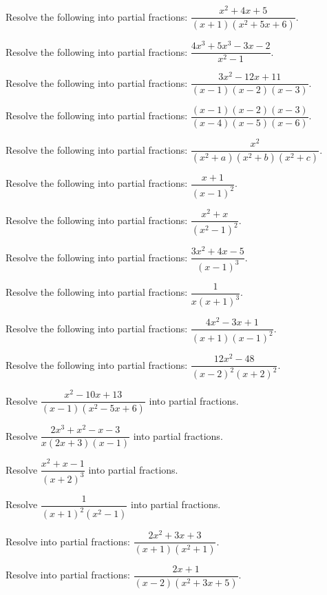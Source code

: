 \documentclass[11pt,a4paper]{article}
\begin{document}
\begin{longlist}
\item Resolve the following into partial fractions: $\dfrac{x^2+4x+5}{(x+1)(x^2+5x+6)}$.

\item Resolve the following into partial fractions: $\dfrac{4x^3+5x^3-3x-2}{x^2-1}$.

\item Resolve the following into partial fractions: $\dfrac{3x^2-12x+11}{(x-1)(x-2)(x-3)}$.

\item Resolve the following into partial fractions: $\dfrac{(x-1)(x-2)(x-3)}{(x-4)(x-5)(x-6)}$.

\item Resolve the following into partial fractions: $\dfrac{x^2}{(x^2+a)(x^2+b)(x^2+c)}$.

\item Resolve the following into partial fractions: $\dfrac{x+1}{(x-1)^2}$.

\item Resolve the following into partial fractions: $\dfrac{x^2+x}{(x^2-1)^2}$.

\item Resolve the following into partial fractions: $\dfrac{3x^2+4x-5}{(x-1)^3}$.

\item Resolve the following into partial fractions: $\dfrac{1}{x(x+1)^3}$.

\item Resolve the following into partial fractions: $\dfrac{4x^2-3x+1}{(x+1)(x-1)^2}$.

\item Resolve the following into partial fractions: $\dfrac{12x^2-48}{(x-2)^2(x+2)^2}$.

\item Resolve $\dfrac{x^2-10x+13}{(x-1)(x^2-5x+6)}$ into partial fractions.

\item Resolve $\dfrac{2x^3+x^2-x-3}{x(2x+3)(x-1)}$ into partial fractions.

\item Resolve $\dfrac{x^2+x-1}{(x+2)^3}$ into partial fractions.

\item Resolve $\dfrac{1}{(x+1)^2(x^2-1)}$ into partial fractions.

\item Resolve into partial fractions: $\dfrac{2x^2+3x+3}{(x+1)(x^2+1)}$.

\item Resolve into partial fractions: $\dfrac{2x+1}{(x-2)(x^2+3x+5)}$.


\end{longlist}
\end{document}
